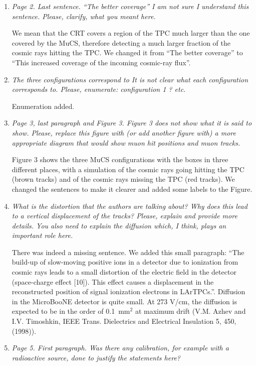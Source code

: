 \documentclass[review,number,sort&compress]{article}
\begin{document}
\begin{enumerate}

\item \emph{Page 2. Last sentence.
``The better coverage''
I am not sure I understand this sentence. Please, clarify, what you meant here.}

We mean that the CRT covers a region of the TPC much larger than the one covered by the MuCS, therefore detecting a much larger fraction of the cosmic rays hitting the TPC. We changed it from ``The better coverage'' to ``This increased coverage of the incoming cosmic-ray flux''.

\item \emph{The three configurations correspond to
It is not clear what each configuration corresponds to. Please, enumerate: configuration 1 ? etc.}

Enumeration added.


\item \emph{Page 3, last paragraph and Figure 3.
Figure 3 does not show what it is said to show. Please, replace this figure with (or add another figure with) a more appropriate diagram that would show muon hit positions and muon tracks.}

Figure 3 shows the three MuCS configurations with the boxes in three different places, with a simulation of the cosmic rays going hitting the TPC (brown tracks) and of the cosmic rays missing the TPC (red tracks). We changed the sentences to make it clearer and added some labels to the Figure.

\item \emph{What is the distortion that the authors are talking about? Why does this lead to a vertical displacement of the tracks? Please, explain and provide more details.
You also need to explain the diffusion which, I think, plays an important role here.}

There was indeed a missing sentence. We added this small paragraph: ``The build-up of slow-moving positive ions in a detector due to ionization from cosmic rays leads to a small distortion of the electric field in the detector (space-charge effect [10]). This effect causes a displacement in the reconstructed position of signal ionization electrons in LArTPCs.''. Diffusion in the MicroBooNE detector is quite small. At 273 V/cm, the diffusion is expected to be in the order of 0.1~mm$^{2}$ at maximum drift (V.M. Azhev and I.V. Timoshkin, IEEE Trans. Dielectrics and Electrical Insulation 5, 450, (1998)).

\item \emph{Page 5. First paragraph.
Was there any calibration, for example with a radioactive source, done to justify the statements here?}


\end{enumerate}
\end{document}
